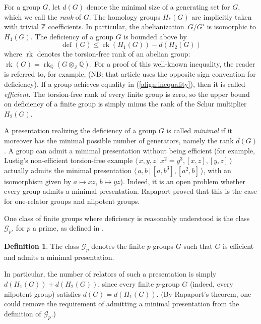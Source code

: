 \documentclass[a4paper,12pt]{amsart}
\theoremstyle{plain}
\theoremstyle{definition}
\newtheorem{defn}[lem]{Definition}
\newcommand{\Gp}{\mathcal{G}_p}
\newcommand{\Q}{\mathbb{Q}}
\newcommand{\Z}{\mathbb{Z}}
\newcommand{\df}{\operatorname{def}}
\newcommand{\gp}[2]{\langle \, #1 \, | \, #2 \, \rangle}
\begin{document}
For a group $G$, let $d(G)$ denote the minimal size of a generating set for $G$, which we call the \emph{rank} of $G$.
The homology groups $H_*(G)$ are implicitly taken with trivial $\Z$ coefficients.
In particular, the abelianization~$G / G'$ is isomorphic to $H_1(G)$.
The deficiency of a group $G$ is bounded above by
\begin{equation}
    \label{align:inequality}
    \tag{$\star$}
    \df(G) \leq \operatorname{rk}(H_1(G)) - d(H_2(G))
\end{equation}
where $\operatorname{rk}$ denotes the torsion-free rank of an abelian group: $\operatorname{rk}(G) = \operatorname{rk}_\Q (G \otimes_\Z \Q)$.
For a proof of this well-known inequality, the reader is referred to, for example, \cite[Lemma 2]{bridsontweedale} (NB: that article uses the opposite sign convention for deficiency).
If a group achieves equality in (\ref{align:inequality}), then it is called \emph{efficient}.
The torsion-free rank of every finite group is zero, so the upper bound on deficiency of a finite group is simply minus the rank of the Schur multiplier $H_2(G)$.

A presentation realizing the deficiency of a group $G$ is called \emph{minimal} if it moreover has the minimal possible number of generators, namely the rank $d(G)$.
A group can admit a minimal presentation without being efficient (for example, Lustig's non-efficient torsion-free example $\gp{x,y,z}{x^2=y^3, [x,z], [y,z]}$ \cite{lustig} actually admits the minimal presentation $\gp{a,b}{[a, b^3], [a^2, b]}$, with an isomorphism given by $a \mapsto xz$, $b \mapsto yz$).
Indeed, it is an open problem whether every group admits a minimal presentation.
Rapaport proved \cite{rapaport} that this is the case for one-relator groups and nilpotent groups.

One class of finite groups where deficiency is reasonably understood is the class $\Gp$, for $p$ a prime, as defined in \cite{johnson}.

\begin{defn}
    The class $\Gp$ denotes the finite $p$-groups $G$ such that $G$ is efficient and admits a minimal presentation.
\end{defn}

In particular, the number of relators of such a presentation is simply $d(H_1(G)) + d(H_2(G))$, since every finite $p$-group $G$ (indeed, every nilpotent group) satisfies $d(G) = d(H_1(G))$.
(By Rapaport's theorem, one could remove the requirement of admitting a minimal presentation from the definition of $\Gp$.)
\end{document}
